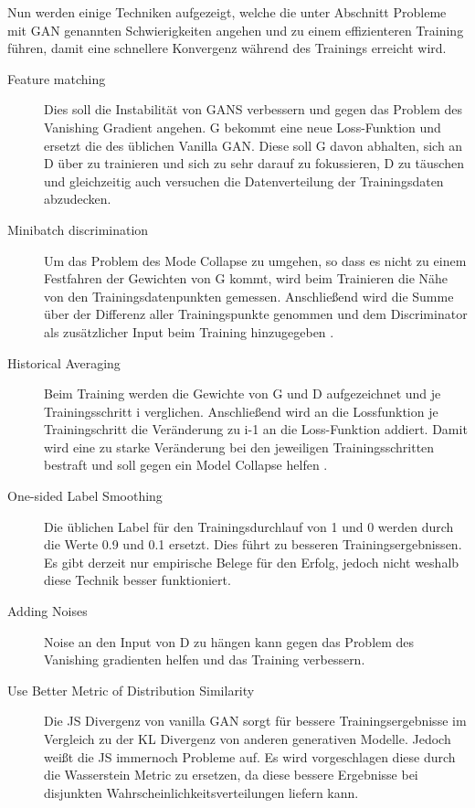 \documentclass{llncs}
\begin{document}
Nun werden einige Techniken aufgezeigt, welche die unter Abschnitt Probleme mit GAN genannten Schwierigkeiten angehen und zu einem effizienteren Training führen, damit eine schnellere Konvergenz während des Trainings erreicht wird.
\begin{description}
\item[Feature matching]
Dies soll die Instabilität von GANS verbessern und gegen das Problem des Vanishing Gradient angehen. G bekommt eine neue Loss-Funktion und ersetzt die des üblichen Vanilla GAN. Diese soll G davon abhalten, sich an D über zu trainieren und sich zu sehr darauf zu fokussieren, D zu täuschen und gleichzeitig auch versuchen die Datenverteilung der Trainingsdaten abzudecken\cite{improvingan}.\\

\item[Minibatch discrimination] Um das Problem des Mode Collapse zu umgehen, so dass es nicht zu einem Festfahren der Gewichten von G kommt, wird beim Trainieren die Nähe von den Trainingsdatenpunkten gemessen. Anschließend wird die Summe über der Differenz aller Trainingspunkte genommen und dem Discriminator als zusätzlicher Input beim Training hinzugegeben \cite{improvingan}.\\

\item[Historical Averaging] 
Beim Training werden die Gewichte von G und D aufgezeichnet und je Trainingsschritt i verglichen. Anschließend wird an die Lossfunktion je Trainingschritt die Veränderung zu i-1 an die Loss-Funktion addiert. Damit wird eine zu starke Veränderung bei den jeweiligen Trainingsschritten bestraft und soll gegen ein Model Collapse helfen \cite{improvingan}.\\

\item[One-sided Label Smoothing]
Die üblichen Label für den Trainingsdurchlauf von 1 und 0 werden durch die Werte 0.9 und 0.1 ersetzt. Dies führt zu besseren Trainingsergebnissen. Es gibt derzeit nur empirische Belege für den Erfolg, jedoch nicht weshalb diese Technik besser funktioniert\cite{improvingan}.\\

\item[Adding Noises] 
Noise an den Input von D zu hängen kann gegen das Problem des Vanishing gradienten helfen und das Training verbessern\cite{improvingan}.\\

\item[Use Better Metric of Distribution Similarity] 
Die JS Divergenz von vanilla GAN sorgt für bessere Trainingsergebnisse im Vergleich zu der KL Divergenz von anderen generativen Modelle. Jedoch weißt die JS immernoch Probleme auf.  Es wird vorgeschlagen diese durch die Wasserstein Metric zu ersetzen, da diese bessere Ergebnisse bei disjunkten Wahrscheinlichkeitsverteilungen liefern kann\cite{improvingan}.\\

\end{description}
\newpage
\end{document}
